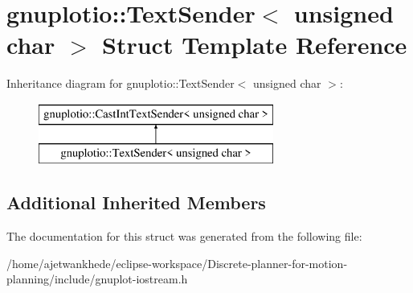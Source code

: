 \hypertarget{structgnuplotio_1_1TextSender_3_01unsigned_01char_01_4}{}\section{gnuplotio\+:\+:Text\+Sender$<$ unsigned char $>$ Struct Template Reference}
\label{structgnuplotio_1_1TextSender_3_01unsigned_01char_01_4}
Inheritance diagram for gnuplotio\+:\+:Text\+Sender$<$ unsigned char $>$\+:\begin{figure}[H]
\begin{center}
\leavevmode
\includegraphics[height=2.000000cm]{structgnuplotio_1_1TextSender_3_01unsigned_01char_01_4}
\end{center}
\end{figure}
\subsection*{Additional Inherited Members}


The documentation for this struct was generated from the following file\+:\begin{DoxyCompactItemize}
\item 
/home/ajetwankhede/eclipse-\/workspace/\+Discrete-\/planner-\/for-\/motion-\/planning/include/gnuplot-\/iostream.\+h\end{DoxyCompactItemize}
